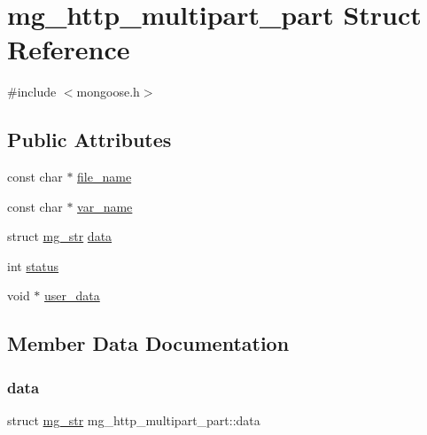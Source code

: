 \hypertarget{structmg__http__multipart__part}{}\section{mg\+\_\+http\+\_\+multipart\+\_\+part Struct Reference}
\label{structmg__http__multipart__part}


{\ttfamily \#include $<$mongoose.\+h$>$}

\subsection*{Public Attributes}
\begin{DoxyCompactItemize}
\item 
const char $\ast$ \hyperlink{structmg__http__multipart__part_a838efa2eb99ad6cecd6ae714d4775091_a838efa2eb99ad6cecd6ae714d4775091}{file\+\_\+name}
\item 
const char $\ast$ \hyperlink{structmg__http__multipart__part_af3c6e9825e31f000ec9e26c016eaa707_af3c6e9825e31f000ec9e26c016eaa707}{var\+\_\+name}
\item 
struct \hyperlink{structmg__str}{mg\+\_\+str} \hyperlink{structmg__http__multipart__part_a803db4feee24a462665d487acbeb1953_a803db4feee24a462665d487acbeb1953}{data}
\item 
int \hyperlink{structmg__http__multipart__part_a728d1246c153ef43fb1f821bee61925a_a728d1246c153ef43fb1f821bee61925a}{status}
\item 
void $\ast$ \hyperlink{structmg__http__multipart__part_ab0c10748e6a40d9c85b4ec0ac98047bd_ab0c10748e6a40d9c85b4ec0ac98047bd}{user\+\_\+data}
\end{DoxyCompactItemize}


\subsection{Member Data Documentation}
\mbox{\label{structmg__http__multipart__part_a803db4feee24a462665d487acbeb1953_a803db4feee24a462665d487acbeb1953}} 
\subsubsection{\texorpdfstring{data}{data}}
{\footnotesize\ttfamily struct \hyperlink{structmg__str}{mg\+\_\+str} mg\+\_\+http\+\_\+multipart\+\_\+part\+::data}



